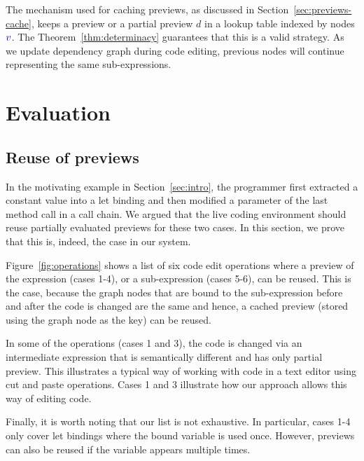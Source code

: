\documentclass[acmsmall,anonymous,fleqn]{acmart}\settopmatter{printfolios=false,printccs=false,printacmref=false}
\theoremstyle{plain}
\theoremstyle{definition}
\newcommand{\bndclr}[1]{\textcolor{kvdclr}{#1}}
\begin{document}
The mechanism used for caching previews, as discussed in Section~\ref{sec:previews-cache},
keeps a preview or a partial preview $d$ in a lookup table indexed by nodes $\bndclr{v}$. The
Theorem~\ref{thm:determinacy} guarantees that this is a valid strategy. As we update dependency
graph during code editing, previous nodes will continue representing the same sub-expressions.


\section{Evaluation}
\label{sec:evaluation}

\subsection{Reuse of previews}
\label{sec:evaluation-reuse}

In the motivating example in Section~\ref{sec:intro}, the programmer first extracted a constant
value into a let binding and then modified a parameter of the last method call in a call chain.
We argued that the live coding environment should reuse partially evaluated previews for these
two cases. In this section, we prove that this is, indeed, the case in our system.

Figure~\ref{fig:operations} shows a list of six code edit operations where a preview of the
expression (cases 1-4), or a sub-expression (cases 5-6), can be reused. This is the case, because
the graph nodes that are bound to the sub-expression before and after the code is changed are the
same and hence, a cached preview (stored using the graph node as the key) can be reused.

In some of the operations (cases 1 and 3), the code is changed via an intermediate expression
that is semantically different and has only partial preview. This illustrates a typical way of
working with code in a text editor using cut and paste operations. Cases 1 and 3 illustrate how
our approach allows this way of editing code.

Finally, it is worth noting that our list is not exhaustive. In particular, cases 1-4 only cover
let bindings where the bound variable is used once. However, previews can also be reused if the
variable appears multiple times.

\end{document}
